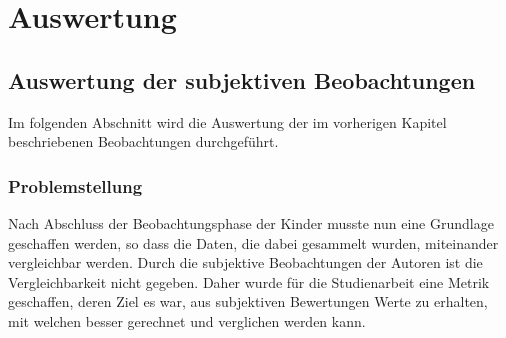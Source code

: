 \chapter{Auswertung}
\section{Auswertung der subjektiven Beobachtungen}\label{sec:auswertungSubjektiv}
Im folgenden Abschnitt wird die Auswertung der im vorherigen Kapitel beschriebenen Beobachtungen durchgeführt.
\subsection{Problemstellung}
Nach Abschluss der Beobachtungsphase der Kinder musste nun eine Grundlage geschaffen werden, so dass die Daten, die dabei gesammelt wurden, miteinander vergleichbar werden. Durch die subjektive Beobachtungen der Autoren ist die Vergleichbarkeit nicht gegeben. Daher wurde für die Studienarbeit eine Metrik geschaffen, deren Ziel es war, aus subjektiven Bewertungen Werte zu erhalten, mit welchen besser gerechnet und verglichen werden kann.
